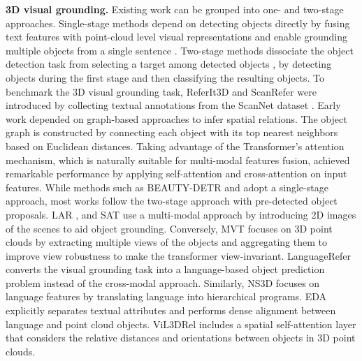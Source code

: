 \noindent \textbf{3D visual grounding.}
Existing work can be grouped into one- and two-stage approaches. Single-stage methods depend on detecting objects directly by fusing text features with point-cloud level visual representations and enable grounding multiple objects from a single sentence \citep{mdetr, luo20223d}. 
Two-stage methods dissociate the object detection task from selecting a target among detected objects \citep{achlioptas2020referit3d, chen2020scanrefer}, by detecting objects during the first stage and then classifying the resulting objects. 
To benchmark the 3D visual grounding task, ReferIt3D \citep{achlioptas2020referit3d} and ScanRefer \citep{chen2020scanrefer} were introduced by collecting textual annotations from the ScanNet dataset \citep{dai2017scannet}. 
Early work depended on graph-based approaches \citep{veličković2018graph, wang2019dynamic} to infer spatial relations. The object graph is constructed by connecting each object with its top nearest neighbors \citep{abdelreheem20223dreftransformer,feng2021free, 
huang2021text, yuan2021instancerefer} based on Euclidean distances. Taking advantage of the Transformer’s attention mechanism, which is naturally suitable for multi-modal features fusion, \citep{he2021transrefer3d, zhao20213dvg} achieved remarkable performance by applying self-attention and cross-attention on input features. 
While methods such as BEAUTY-DETR \citep{jain2022bottom} and \citep{luo20223d} adopt a single-stage approach, most works follow the two-stage approach with pre-detected object proposals. 
LAR \citep{bakr2022look}, and SAT \citep{yang2021sat} use a multi-modal approach by introducing 2D images of the scenes to aid object grounding. Conversely, MVT \citep{huang2022multi} focuses on 3D point clouds by extracting multiple views of the objects and aggregating them to improve view robustness to make the transformer view-invariant. 
LanguageRefer \citep{roh2022languagerefer} converts the visual grounding task into a language-based object prediction problem instead of the cross-modal approach. 
Similarly, NS3D \citep{hsu2023ns3d} focuses on language features by translating language into hierarchical programs. 
EDA \citep{wu2022eda} explicitly separates textual attributes and performs dense alignment between language and point cloud objects. 
ViL3DRel \citep{chen2022language} includes a spatial self-attention layer that considers the relative distances and orientations between objects in 3D point clouds.

